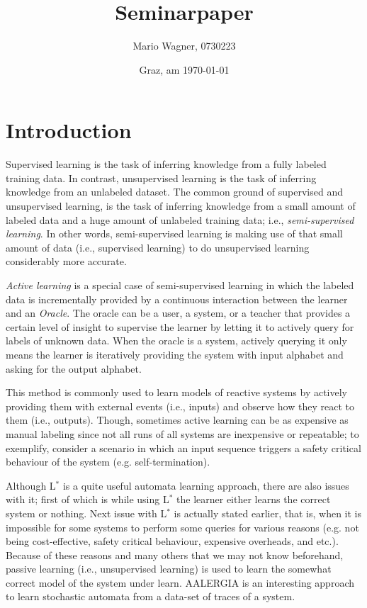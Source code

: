\documentclass[
a4paper,
12pt
]{scrartcl}
\title{Seminarpaper}
\author{Mario Wagner, 0730223}
\date{Graz, am \today{}}
\newcommand\me[1]{ [* {\textbf ME:} #1 *]}
\begin{document}
 \maketitle
 \tableofcontents
 \listoffigures
 \listoftables

\newpage


\section{Introduction}
Supervised learning is the task of inferring knowledge from a fully labeled training data. In contrast, unsupervised learning is the task of inferring knowledge from an unlabeled dataset. The common ground of supervised and unsupervised learning, is the task of inferring knowledge from a small amount of labeled data and a huge amount of unlabeled training data; i.e., \emph{semi-supervised learning}. In other words, semi-supervised learning is making use of that small amount of data (i.e., supervised learning) to do unsupervised learning considerably more accurate.
\par \emph{Active learning} is a special case of semi-supervised learning in which the labeled data is incrementally provided by a continuous interaction between the learner and an \emph{Oracle}. The oracle can be a user, a system, or a teacher that provides a certain level of insight to supervise the learner by letting it to actively query for labels of unknown data. When the oracle is a system, actively querying it only means the learner is iteratively providing the system with input alphabet and asking for the output alphabet.
\par This method is commonly used to learn models of reactive systems by actively providing them with external events (i.e., inputs) and observe how they react to them (i.e., outputs). Though, sometimes active learning can be as expensive as manual labeling since not all runs of all systems are inexpensive or repeatable; to exemplify, consider a scenario in which an input sequence triggers a safety critical behaviour of the system (e.g. self-termination).
\par \me{here goes a brief history about the L$^*$ algorithm of Angluin (2 or 3 paragraphs).}
\par Although L$^*$ is a quite useful automata learning approach, there are also issues with it; first of which is while using L$^*$ the learner either learns the correct system or nothing. Next issue with L$^*$ is actually stated earlier, that is, when it is impossible for some systems to perform some queries for various reasons (e.g. not being cost-effective, safety critical behaviour, expensive overheads, and etc.). Because of these reasons and many others that we may not know beforehand, passive learning (i.e., unsupervised learning) is used to learn the somewhat correct model of the system under learn. AALERGIA\cite{Mao.} is an interesting approach to learn stochastic automata from a data-set of traces of a system.
\end{document}
